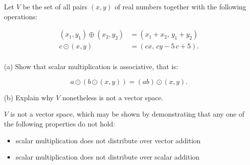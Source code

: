 
\begin{exerciseStatement}


 Let \(V\) be the set of all pairs \((x,y)\) of real numbers together with the following operations: 


\begin{align*} (x_1,y_1)\oplus (x_2,y_2)&= \left(x_{1} + x_{2},\,y_{1} + y_{2}\right)  \\c \odot (x,y) &= \left(c x,\,c y - 5 \, c + 5\right) . \\ \end{align*}
            

 (a) Show that scalar multiplication is associative, that is: 

\[a\odot(b\odot (x,y))=(ab)\odot(x,y).
    \]

 (b) Explain why \(V\) nonetheless is not a vector space. 


\end{exerciseStatement}
    
\begin{exerciseAnswer} 


\(V\) is not a vector space, which may be shown by demonstrating that any one of the following properties do not hold: 


\begin{itemize}
\item scalar multiplication does not distribute over vector addition
\item scalar multiplication does not distribute over scalar addition
\end{itemize}
    
\end{exerciseAnswer}
    
